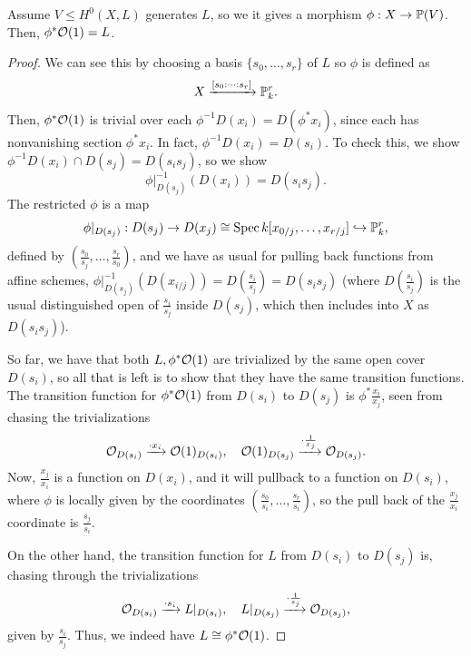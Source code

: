 \documentclass[12pt]{article}
\begin{document}
\begin{prop}
    Assume $V\leq H^0(X,L)$ generates $L$, so we it gives a morphism $\phi: X\to \P(V)$. Then, $\phi^* \cO(1) = L$.
\end{prop}
\begin{proof}
    We can see this by choosing a basis $\{s_0,\dots,s_r\}$ of $L$ so $\phi$ is defined as 
    \[X \xrightarrow{[s_0: \cdots : s_r]} \P^r_k.\]
    Then, $\phi^* \cO(1)$ is trivial over each $\phi^{-1}D(x_i)=D(\phi^*x_i)$, since each has nonvanishing section $\phi^*x_i$. In fact, $\phi^{-1}D(x_i)=D(s_i)$. To check this, we show $\phi^{-1}D(x_i) \cap D(s_j) = D(s_is_j)$, so we show
    \[\phi|_{D(s_j)}^{-1}(D(x_i)) = D(s_is_j).\]
    The restricted $\phi$ is a map
    \[\phi|_{D(s_j)}: D(s_j) \to D(x_j) \cong \Spec k[x_{0/j},\dots,x_{r/j}] \hookrightarrow \P^r_k,\]
    defined by $(\frac{s_0}{s_j},\dots,\frac{s_r}{s_0})$, and we have as usual for pulling back functions from affine schemes, $\phi|_{D(s_j)}^{-1}(D(x_{i/j}))=D(\frac{s_i}{s_j}) = D(s_i s_j)$ (where $D(\frac{s_i}{s_j})$ is the usual distinguished open of $\frac{s_i}{s_j}$ inside $D(s_j)$, which then includes into $X$ as $D(s_is_j)$).
    
    So far, we have that both $L,\phi^* \cO(1)$ are trivialized by the same open cover $D(s_i)$, so all that is left is to show that they have the same transition functions. The transition function for $\phi^*\cO(1)$ from $D(s_i)$ to $D(s_j)$ is $\phi^* \frac{x_i}{x_j}$, seen from chasing the trivializations
    \[\cO_{D(s_i)} \xrightarrow{\cdot x_i} \cO(1)_{D(s_i)}, \quad \cO(1)_{D(s_j)} \xrightarrow{\cdot \frac{1}{x_j}} \cO_{D(s_j)}.\]
    Now, $\frac{x_j}{x_i}$ is a function on $D(x_i)$, and it will pullback to a function on $D(s_i)$, where $\phi$ is locally given by the coordinates $(\frac{s_0}{s_i},\dots,\frac{s_r}{s_i})$, so the pull back of the $\frac{x_j}{x_i}$ coordinate is $\frac{s_j}{s_i}$.
    
    On the other hand, the transition function for $L$ from $D(s_i)$ to $D(s_j)$ is, chasing through the trivializations
    \[\cO_{D(s_i)} \xrightarrow{\cdot s_i} L|_{D(s_i)}, \quad L|_{D(s_j)} \xrightarrow{\cdot \frac{1}{s_j}} \cO_{D(s_j)},\]
    given by $\frac{s_i}{s_j}$. Thus, we indeed have $L\cong \phi^* \cO(1)$.
\end{proof}
\end{document}
